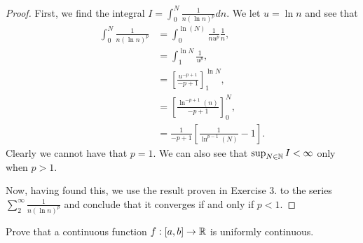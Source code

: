 \documentclass[twoside]{article}
\begin{document}
    \begin{proof}
        First, we find the integral $I = \int_{0}^{N} \frac{1}{n(\ln n)^{p}} dn$. We let $u = \ln n$ and see that
        \begin{align*}
            \int_{0}^{N} \frac{1}{n(\ln n)^{p}} &= \int_{0}^{\ln(N)} \frac{1}{nu^{p}}\frac{1}{n},\\ 
                                                &= \int_{1}^{\ln N}\frac{1}{u^{p}}, \\
                                                &= \left[\frac{u^{-p + 1}}{-p + 1}\right]_{1}^{\ln N},\\ 
                                                &=  \left[\frac{\ln^{-p + 1}(n)}{-p + 1}\right]_{0}^{N},\\ 
                                                &= \frac{1}{-p + 1}\left[\frac{1}{\ln^{p-1}(N)} - 1\right].
        \end{align*}
        Clearly we cannot have that $p = 1$. We can also see that $\sup_{N \in \mathbb{N}} I < \infty$ only 
        when $p > 1$.

        Now, having found this, we use the result proven in Exercise 3. to the series 
        $\sum_{2}^{\infty} \frac{1}{n(\ln n)^{p}}$ and conclude that it converges if and only if $p < 1$.
    \end{proof}

    \newpage
    Prove that a continuous function $f : [a,b] \to \mathbb{R} $ is uniformly continuous.
\end{document}
